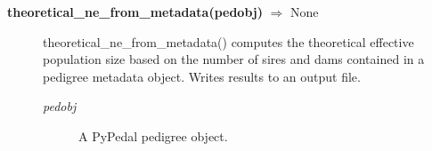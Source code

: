 \begin{description}
\item[\textbf{theoretical\_ne\_from\_metadata(pedobj)} $\Rightarrow$ None]
theoretical\_ne\_from\_metadata() computes the theoretical effective population size based on the number of sires and dams contained in a pedigree metadata object. Writes results to an output file.
\begin{description}
\item[\emph{pedobj}] A PyPedal pedigree object.
\end{description}
\end{description}